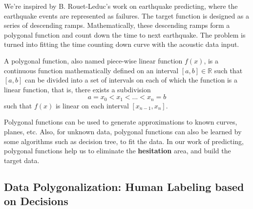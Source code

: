 \documentclass[sigconf]{acmart}
\begin{document}

We're inspired by B. Rouet-Leduc's work \cite{rouet2017machine} on earthquake predicting, where the earthquake events are represented as failures. The target function is designed as a series of descending ramps. Mathematically, these descending ramps form a polygonal function and count down the time to next earthquake. The problem is turned into fitting the time counting down curve with the acoustic data input.

A polygonal function, also named piece-wise linear function $f(x)$, is a continuous function mathematically defined on an interval $[a, b]\in \mathbb R$ such that $[a, b]$ can be divided into a set of intervals on each of which the function is a linear function, that is, there exists a subdivision 
\begin{equation}
    a=x_0 < x_1 < ... < x_n=b
\end{equation}
such that $f(x)$ is linear on each interval $[x_{n-1}, x_n]$.

Polygonal functions can be used to generate approximations to known curves, planes, etc. Also, for unknown data, polygonal functions can also be learned by some algorithms such as decision tree, to fit the data. In our work of predicting, polygonal functions help us to eliminate the \textbf{hesitation} area, and build the target data.

\subsection{Data Polygonalization: Human Labeling based on Decisions}
\end{document}
